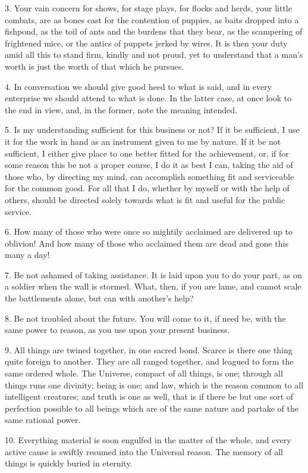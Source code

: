\documentclass{book}
\begin{document}
3. Your vain concern for shows, for stage plays, for flocks and herds,
your little combats, are as bones cast for the contention of puppies,
as baits dropped into a fishpond, as the toil of ants and the burdens
that they bear, as the scampering of frightened mice, or the antics of
puppets jerked by wires. It is then your duty amid all this to stand
firm, kindly and not proud, yet to understand that a man's worth is
just the worth of that which he pursues.

4. In conversation we should give good heed to what is said, and in
every enterprise we should attend to what is done. In the latter case,
at once look to the end in view, and, in the former, note the meaning
intended.

5. Is my understanding sufficient for this business or not? If it be
sufficient, I use it for the work in hand as an instrument given to me
by nature. If it be not sufficient, I either give place to one better
fitted for the achievement, or, if for some reason this be not a
proper course, I do it as best I can, taking the aid of those who, by
directing my mind, can accomplish something fit and serviceable for
the common good. For all that I do, whether by myself or with the help
of others, should be directed solely towards what is fit and useful
for the public service.

6. How many of those who were once so mightily acclaimed are delivered
up to oblivion! And how many of those who acclaimed them are dead and
gone this many a day!

7. Be not ashamed of taking assistance. It is laid upon you to do your
part, as on a soldier when the wall is stormed. What, then, if you are
lame, and cannot scale the battlements alone, but can with another's
help?

8. Be not troubled about the future. You will come to it, if need be,
with the same power to reason, as you use upon your present business.

9. All things are twined together, in one sacred bond. Scarce is there
one thing quite foreign to another. They are all ranged together, and
leagued to form the same ordered whole. The Universe, compact of all
things, is one; through all things runs one divinity; being is one;
and law, which is the reason common to all intelligent creatures; and
truth is one as well, that is if there be but one sort of perfection
possible to all beings which are of the same nature and partake of the
same rational power.

10. Everything material is soon engulfed in the matter of the whole,
and every active cause is swiftly resumed into the Universal
reason. The memory of all things is quickly buried in eternity.
\end{document}
